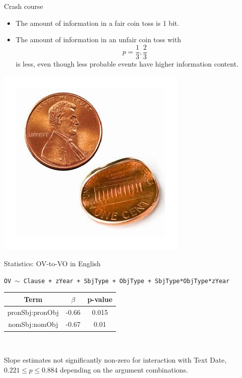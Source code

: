 \documentclass[hyperref={pdfpagelabels=false}]{beamer}
\begin{document}
\begin{frame}{Crash course} 
	\begin{itemize}
		\item The amount of information in a fair coin toss is 1 bit.
		\item The amount of information in an unfair coin toss with $$p = \frac{1}{3}, \frac{2}{3}$$ is less, even though less probable events have higher information content.
	\end{itemize}
	\begin{center}
		\includegraphics[scale=0.4]{bentcoin.jpg}
	\end{center}
\end{frame}

\begin{frame}{Statistics: OV-to-VO in English} 
	
	\begin{center}
		\texttt{OV $\sim$ Clause + zYear + SbjType + ObjType + SbjType*ObjType*zYear}\\\vspace{5mm}

\begin{tabular}{c c c}
\textbf{Term} & \textbf{$\beta$} & \textbf{p-value} \\ \hline
pronSbj:pronObj & -0.66 & 0.015\\
nomSbj:nomObj & -0.67 & 0.01 \\

	
\end{tabular}\\\vspace{5mm}

	Slope estimates not significantly non-zero for interaction with Text Date, $ 0.221 \leq p \leq 0.884$ depending on the argument combinations.
\end{center}

\end{frame}
\end{document}
